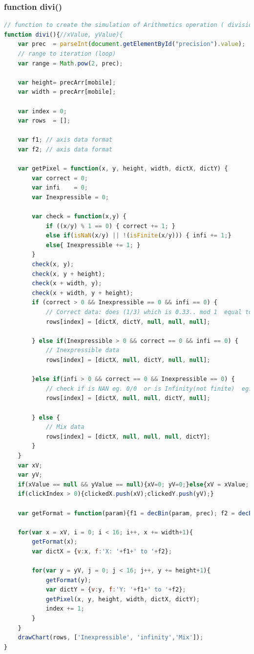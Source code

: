 \documentclass[11pt]{article}
\begin{document}
\subsubsection{function divi()}
\begin{lstlisting}[label={lst:divi}, language=Javascript, caption={divi function},]
// function to create the simulation of Arithmetics operation ( division )
function divi(){//xValue, yValue){
	var prec  = parseInt(document.getElementById("precision").value);
	// range to iteration (loop)
	var range = Math.pow(2, prec);

	var height= precArr[mobile];
	var width = precArr[mobile];

	var index = 0;
	var rows  = [];

	var f1; // axis data format 
	var f2; // axis data format

	var getPixel = function(x, y, height, width, dictX, dictY) {
		var correct = 0;
		var infi    = 0;
		var Inexpressible = 0;

		var check = function(x,y) {
			if ((x/y) % 1 == 0) { correct += 1; }
			else if(isNaN(x/y) || !(isFinite(x/y))) { infi += 1;}
			else{ Inexpressible += 1; }	
		}
		check(x, y);
		check(x, y + height);
		check(x + width, y);
		check(x + width, y + height);
		if (correct > 0 && Inexpressible == 0 && infi == 0) {
	    	// Correct data: does (1/3) which is 0.33.. mod 1  equal to zero
			rows[index] = [dictX, dictY, null, null, null];

		} else if(Inexpressible > 0 && correct == 0 && infi == 0) {
			// Inexpressible data
			rows[index] = [dictX, null, dictY, null, null];

		}else if(infi > 0 && correct == 0 && Inexpressible == 0) {
			// check if is NAN eg. 0/0  or is Infinity(not finite)  eg. 1/0 , 1000/0
			rows[index] = [dictX, null, null, dictY, null];

		} else {
			// Mix data
			rows[index] = [dictX, null, null, null, dictY];
		}
	}
	var xV;
	var yV; 
	if(xValue == null && yValue == null){xV=0; yV=0;}else{xV = xValue; yV = yValue;}
	if(clickIndex > 0){clickedX.push(xV);clickedY.push(yV);}
	
	var getFormat = function(param){f1 = decBin(param, prec); f2 = decBin(param+height, prec);}
	
	for(var x = xV, i = 0; i < 16; i++, x += width+1){
		getFormat(x);
		var dictX = {v:x, f:'X: '+f1+' to '+f2};
	
		for(var y = yV, j = 0; j < 16; j++, y += height+1){
			getFormat(y);
			var dictY = {v:y, f:'Y: '+f1+' to '+f2};
			getPixel(x, y, height, width, dictX, dictY);
			index += 1;
		}
	}
	drawChart(rows, ['Inexpressible', 'infinity','Mix']);
}
\end{lstlisting}
\end{document}
